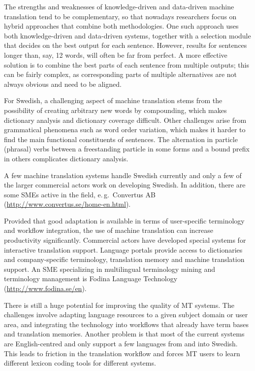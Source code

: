 \begin{multicols}{2}
The strengths and weaknesses of knowledge-driven and data-driven machine translation tend to be complementary, so that nowadays researchers focus on hybrid approaches that combine both methodologies. One such approach uses both knowledge-driven and data-driven systems, together with a selection module that decides on the best output for each sentence. However, results for sentences longer than, say, 12 words, will often be far from perfect. A more effective solution is to combine the best parts of each sentence from multiple outputs; this can be fairly complex, as corresponding parts of multiple alternatives are not always obvious and need to be aligned. 


For Swedish, a challenging aspect of machine translation stems from
the possibility of creating arbitrary new words by compounding, which
makes dictionary analysis and dictionary coverage difficult. Other
challenges arise from grammatical phenomena such as word order
variation, which makes it harder to find the main functional
constituents of sentences. The alternation in particle (phrasal)
verbs between a freestanding particle in some forms and a bound prefix
in others complicates dictionary analysis.

A few machine translation systems handle Swedish currently and only a few of the larger commercial actors work on developing Swedish. In addition, there are some SMEs active in the field, e.\,g.~Convertus AB (\url{http://www.convertus.se/home-en.html}).

Provided that good adaptation is available in terms of user-specific
terminology and workflow integration, the use of machine translation
can increase productivity significantly. Commercial actors have
developed special systems for interactive translation
support. Language portals provide access to dictionaries and
company-specific terminology, translation memory and machine
translation support. An SME specializing in multilingual terminology
mining and terminology management is Fodina
Language Technology (\url{http://www.fodina.se/en}).

There is still a huge potential for improving the quality of MT systems. The challenges involve adapting language resources to a given subject domain or user area, and integrating the technology into workflows that already have term bases and translation memories. Another problem is that most of the current systems are English-centred and only support a few languages from and into Swedish. This leads to friction in the translation workflow and forces MT users to learn different lexicon coding tools for different systems.


\end{multicols}
